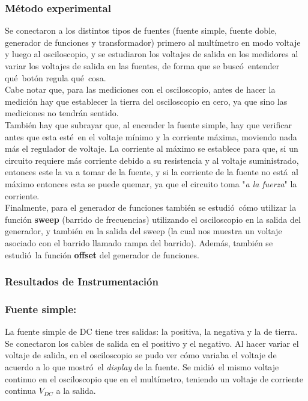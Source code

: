 \documentclass{article}
\begin{document}
\subsubsection{M\'etodo experimental}
Se conectaron a los distintos tipos de fuentes (fuente simple, fuente doble, generador de funciones y transformador) primero al mult\'imetro en modo voltaje y luego al osciloscopio, y se estudiaron los voltajes de salida en los medidores al variar los voltajes de salida en las fuentes, de forma que se busc\'o\ entender qu\'e\ bot\'on regula qu\'e\ cosa. \\
Cabe notar que, para las mediciones con el osciloscopio, antes de hacer la medici\'on hay que establecer la tierra del osciloscopio en cero, ya que sino las mediciones no tendr\'an sentido. \\
Tambi\'en hay que subrayar que, al encender la fuente simple, hay que verificar antes que esta est\'e\ en el voltaje m\'inimo y la corriente m\'axima, moviendo nada m\'as el regulador de voltaje. La corriente al m\'aximo se establece para que, si un circuito requiere m\'as corriente debido a su resistencia y al voltaje suministrado, entonces este la va a tomar de la fuente, y si la corriente de la fuente no est\'a\ al m\'aximo entonces esta se puede quemar, ya que el circuito toma "\textit{a la fuerza}" la corriente. \\
Finalmente, para el generador de funciones tambi\'en se estudi\'o\ c\'omo utilizar la funci\'on \textbf{sweep} (barrido de frecuencias) utilizando el osciloscopio en la salida del generador, y tambi\'en en la salida del sweep (la cual nos muestra un voltaje asociado con el barrido llamado rampa del barrido). Adem\'as, tambi\'en se estudi\'o\ la funci\'on \textbf{offset} del generador de funciones.
\subsubsection{Resultados de Instrumentaci\'on}

\subsubsection*{Fuente simple:}
La fuente simple de DC tiene tres salidas: la positiva, la negativa y la de tierra. Se conectaron los cables de salida en el positivo y el negativo. Al hacer variar el voltaje de salida, en el osciloscopio se pudo ver c\'omo variaba el voltaje de acuerdo a lo que mostr\'o\ el \textit{display} de la fuente. Se midi\'o\ el mismo voltaje continuo en el osciloscopio que en el mult\'imetro, teniendo un voltaje de corriente continua $V_{DC}$ a la salida.
\end{document}
